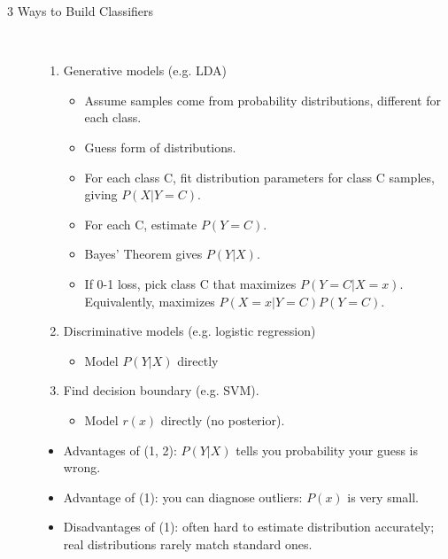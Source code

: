 \documentclass[10pt]{article}
\begin{document}
\begin{description}
	\item[3 Ways to Build Classifiers]
	\
		\begin{enumerate}
			\item Generative models (e.g. LDA)
				\begin{itemize}
					\item Assume samples come from probability distributions, different for each class.
					\item Guess form of distributions.
					\item For each class C, fit distribution parameters for class C samples, giving $P(X|Y=C)$.
					\item For each C, estimate $P(Y=C)$.
					\item Bayes' Theorem gives $P(Y|X)$.
					\item If 0-1 loss, pick class C that maximizes $P(Y=C|X=x)$. Equivalently, maximizes $P(X=x|Y=C)P(Y=C)$.
				\end{itemize}
			\item Discriminative models (e.g. logistic regression)
				\begin{itemize}
					\item Model $P(Y|X)$ directly 
				\end{itemize}
			\item Find decision boundary (e.g. SVM).
				\begin{itemize}
					\item Model $r(x)$ directly (no posterior).
				\end{itemize}
		\end{enumerate}
		
		\begin{itemize}
			\item Advantages of (1, 2): $P(Y|X)$ tells you probability your guess is wrong.
			\item Advantage of (1): you can diagnose outliers: $P(x)$ is very small.
			\item Disadvantages of (1): often hard to estimate distribution accurately; real distributions rarely match standard ones.
		\end{itemize}
\end{description}

\newpage
\end{document}
